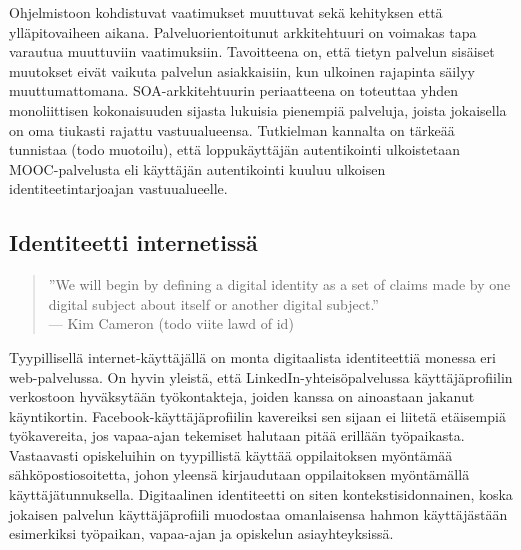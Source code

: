 \documentclass[finnish,gradu]{tktltiki}
\begin{document}
  Ohjelmistoon kohdistuvat vaatimukset muuttuvat sekä kehityksen että ylläpitovaiheen aikana. Palveluorientoitunut arkkitehtuuri on voimakas tapa varautua muuttuviin vaatimuksiin. Tavoitteena on, että tietyn palvelun sisäiset muutokset eivät vaikuta palvelun asiakkaisiin, kun ulkoinen rajapinta säilyy muuttumattomana. SOA-arkkitehtuurin periaatteena on toteuttaa yhden monoliittisen kokonaisuuden sijasta lukuisia pienempiä palveluja, joista jokaisella on oma tiukasti rajattu vastuualueensa. Tutkielman kannalta on tärkeää tunnistaa (todo muotoilu), että loppukäyttäjän autentikointi ulkoistetaan MOOC-palvelusta eli käyttäjän autentikointi kuuluu ulkoisen identiteetintarjoajan vastuualueelle.





  \subsection{Identiteetti internetissä} %
  \label{sub:identiteetti_internetissä}

  \begin{quote}
    ''We will begin by defining a digital identity as a set of claims
    made by one digital subject about itself or another digital subject.''
    \\--- Kim Cameron (todo viite lawd of id)
  \end{quote}

  Tyypillisellä internet-käyttäjällä on monta digitaalista identiteettiä monessa eri web-palvelussa. On hyvin yleistä, että LinkedIn-yhteisöpalvelussa käyttäjäprofiilin verkostoon hyväksytään työkontakteja, joiden kanssa on ainoastaan jakanut käyntikortin. Facebook-käyttäjäprofiilin kavereiksi sen sijaan ei liitetä etäisempiä työkavereita, jos vapaa-ajan tekemiset halutaan pitää erillään työpaikasta. Vastaavasti opiskeluihin on tyypillistä käyttää oppilaitoksen myöntämää sähköpostiosoitetta, johon yleensä kirjaudutaan oppilaitoksen myöntämällä käyttäjätunnuksella. Digitaalinen identiteetti on siten kontekstisidonnainen, koska jokaisen palvelun käyttäjäprofiili muodostaa omanlaisensa hahmon käyttäjästään esimerkiksi työpaikan, vapaa-ajan ja opiskelun asiayhteyksissä.
\end{document}
